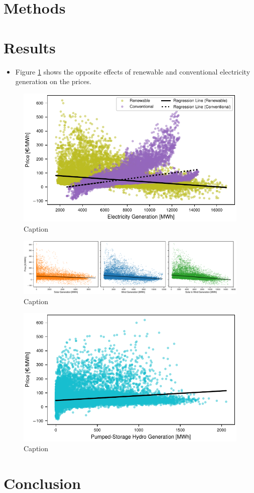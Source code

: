 \documentclass{article}
\begin{document}
\section{Methods}

\section{Results}

\begin{itemize}
    \item Figure \ref{fig:ren_vs_con_regression} shows the opposite effects of renewable and conventional electricity generation on the prices.
    
\end{itemize}

\begin{figure}
    \centering
    \includegraphics[width=0.7\columnwidth]{doc/fig/ren_vs_con_regression.pdf}
    \caption{Caption}
    \label{fig:ren_vs_con_regression}
\end{figure}

\begin{figure}
    \centering
    \includegraphics[width=\columnwidth]{doc/fig/solar_wind_regression.pdf}
    \caption{Caption}
    \label{fig:solar_wind_regression}
\end{figure}

\begin{figure}
    \centering
    \includegraphics[width=0.7\columnwidth]{doc/fig/pumped_hydro_regression.pdf}
    \caption{Caption}
    \label{fig:pumped_hydro_regression}
\end{figure}

\section{Conclusion}



\end{document}
